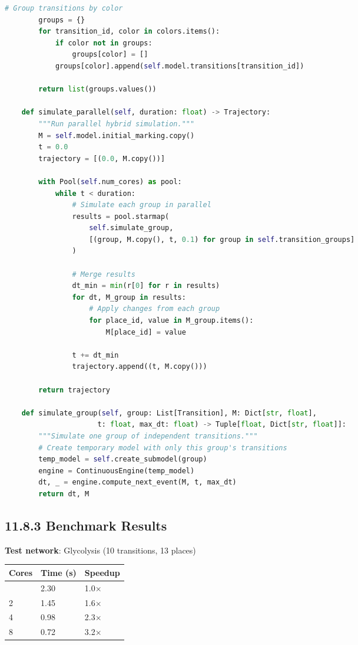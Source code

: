 \begin{lstlisting}[language=Python]
        # Group transitions by color
        groups = {}
        for transition_id, color in colors.items():
            if color not in groups:
                groups[color] = []
            groups[color].append(self.model.transitions[transition_id])
        
        return list(groups.values())
    
    def simulate_parallel(self, duration: float) -> Trajectory:
        """Run parallel hybrid simulation."""
        M = self.model.initial_marking.copy()
        t = 0.0
        trajectory = [(0.0, M.copy())]
        
        with Pool(self.num_cores) as pool:
            while t < duration:
                # Simulate each group in parallel
                results = pool.starmap(
                    self.simulate_group,
                    [(group, M.copy(), t, 0.1) for group in self.transition_groups]
                )
                
                # Merge results
                dt_min = min(r[0] for r in results)
                for dt, M_group in results:
                    # Apply changes from each group
                    for place_id, value in M_group.items():
                        M[place_id] = value
                
                t += dt_min
                trajectory.append((t, M.copy()))
        
        return trajectory
    
    def simulate_group(self, group: List[Transition], M: Dict[str, float], 
                      t: float, max_dt: float) -> Tuple[float, Dict[str, float]]:
        """Simulate one group of independent transitions."""
        # Create temporary model with only this group's transitions
        temp_model = self.create_submodel(group)
        engine = ContinuousEngine(temp_model)
        dt, _ = engine.compute_next_event(M, t, max_dt)
        return dt, M
\end{lstlisting}

\hypertarget{benchmark-results}{%
\subsection{11.8.3 Benchmark Results}\label{benchmark-results}}

\textbf{Test network}: Glycolysis (10 transitions, 13 places)

\begin{longtable}[]{@{}lll@{}}
\toprule\noalign{}
Cores & Time (s) & Speedup \\
\midrule\noalign{}
\endhead
\bottomrule\noalign{}
\endlastfoot
1 & 2.30 & 1.0× \\
2 & 1.45 & 1.6× \\
4 & 0.98 & 2.3× \\
8 & 0.72 & 3.2× \\
\end{longtable}

